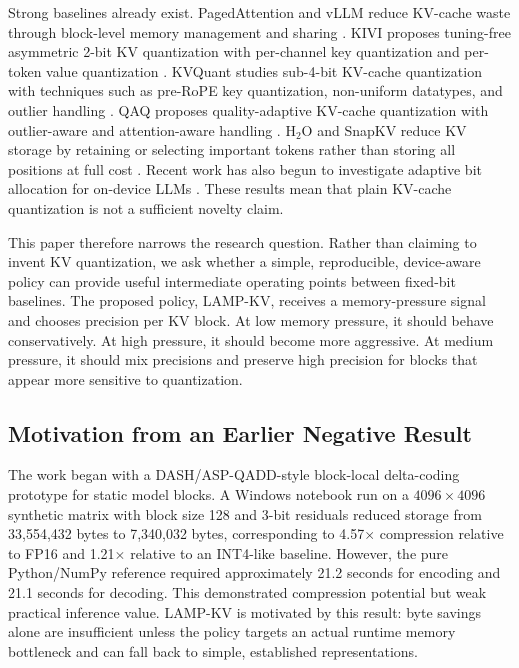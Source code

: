\documentclass[11pt]{article}
\begin{document}
Strong baselines already exist. PagedAttention and vLLM reduce KV-cache waste through block-level memory management and sharing \cite{kwon2023pagedattention}. KIVI proposes tuning-free asymmetric 2-bit KV quantization with per-channel key quantization and per-token value quantization \cite{liu2024kivi}. KVQuant studies sub-4-bit KV-cache quantization with techniques such as pre-RoPE key quantization, non-uniform datatypes, and outlier handling \cite{hooper2024kvquant}. QAQ proposes quality-adaptive KV-cache quantization with outlier-aware and attention-aware handling \cite{dong2024qaq}. H$_2$O and SnapKV reduce KV storage by retaining or selecting important tokens rather than storing all positions at full cost \cite{zhang2023h2o,li2024snapkv}. Recent work has also begun to investigate adaptive bit allocation for on-device LLMs \cite{boroujeni2026dontwastebits}. These results mean that plain KV-cache quantization is not a sufficient novelty claim.

This paper therefore narrows the research question. Rather than claiming to invent KV quantization, we ask whether a simple, reproducible, device-aware policy can provide useful intermediate operating points between fixed-bit baselines. The proposed policy, LAMP-KV, receives a memory-pressure signal and chooses precision per KV block. At low memory pressure, it should behave conservatively. At high pressure, it should become more aggressive. At medium pressure, it should mix precisions and preserve high precision for blocks that appear more sensitive to quantization.

\subsection{Motivation from an Earlier Negative Result}
The work began with a DASH/ASP-QADD-style block-local delta-coding prototype for static model blocks. A Windows notebook run on a $4096\times4096$ synthetic matrix with block size 128 and 3-bit residuals reduced storage from 33,554,432 bytes to 7,340,032 bytes, corresponding to 4.57$\times$ compression relative to FP16 and 1.21$\times$ relative to an INT4-like baseline. However, the pure Python/NumPy reference required approximately 21.2 seconds for encoding and 21.1 seconds for decoding. This demonstrated compression potential but weak practical inference value. LAMP-KV is motivated by this result: byte savings alone are insufficient unless the policy targets an actual runtime memory bottleneck and can fall back to simple, established representations.
\end{document}
